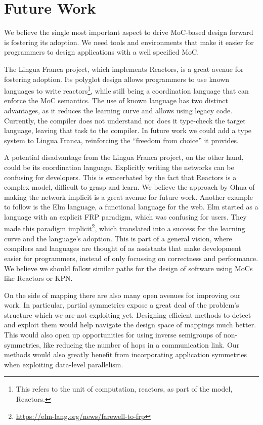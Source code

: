 \section{Future Work}

We believe the single most important aspect to drive \ac{MoC}-based design forward is fostering its adoption.
We need tools and environments that make it easier for programmers to design applications with a well specified \ac{MoC}.

The Lingua Franca project, which implements Reactors, is a great avenue for fostering adoption.
Its polyglot design allows programmers to use known languages to write reactors\footnote{This refers to the unit of computation, reactors, as part of the model, Reactors.}, while still being a coordination language that can enforce the \ac{MoC} semantics.
The use of known language has two distinct advantages, as it reduces the learning curve and allows using legacy code. 
Currently, the compiler does not understand nor does it type-check the target language, leaving that task to the compiler.
In future work we could add a type system to Lingua Franca, reinforcing the ``freedom from choice'' it provides.

A potential disadvantage from the Lingua Franca project, on the other hand, could be its coordination language. 
Explicitly writing the networks can be confusing for developers.
This is exacerbated by the fact that Reactors is a complex model, difficult to grasp and learn.
We believe the approach by Ohua of making the network implicit is a great avenue for future work.
Another example to follow is the Elm language, a functional language for the web.
Elm started as a language with an explicit \ac{FRP} paradigm, which was confusing for users.
They made this paradigm implicit\footnote{\url{https://elm-lang.org/news/farewell-to-frp}}, which translated into a success for the learning curve and the language's adoption.
This is part of a general vision, where compilers and languages are thought of as assistants that make development easier for programmers, instead of only focussing on correctness and performance.
We believe we should follow similar paths for the design of software using \acp{MoC} like Reactors or \ac{KPN}.

On the side of mapping there are also many open avenues for improving our work.
In particular, partial symmetries expose a great deal of the problem's structure which we are not exploiting yet.
Designing efficient methods to detect and exploit them would help navigate the design space of mappings much better.
This would also open up opportunities for using inverse semigroups of non-symmetries, like reducing the number of hops in a communication link.
Our methods would also greatly benefit from incorporating application symmetries when exploiting data-level parallelism.  

